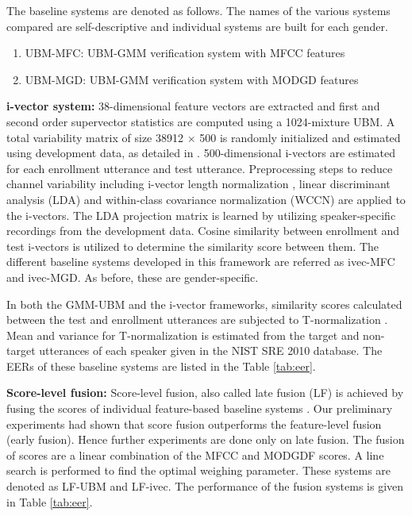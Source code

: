 \documentclass[preprint,12pt,5p]{elsarticle}
\begin{document}
The baseline systems are denoted as follows. The names of the various systems
compared are self-descriptive and individual systems are built for each gender.
\begin{enumerate}
\item UBM-MFC: UBM-GMM verification system with MFCC features
\item UBM-MGD: UBM-GMM verification system with MODGD features
\end{enumerate}

\textbf{i-vector system:} 
38-dimensional feature vectors are extracted and first and second order
supervector statistics are computed using a 1024-mixture UBM. A total
variability matrix of size 38912 $\times$ 500 is randomly initialized and
estimated using development data, as detailed in \cite{dehak_ivector,
kenny_JFA}.  500-dimensional i-vectors are estimated for each enrollment
utterance and test utterance. Preprocessing steps to reduce channel variability
including i-vector length normalization \cite{garciaRomero}, linear discriminant
analysis (LDA) and within-class covariance normalization (WCCN) are applied to
the i-vectors.  The LDA projection matrix is learned by utilizing
speaker-specific recordings from the development data. %
Cosine similarity between enrollment and test i-vectors is utilized to determine
the similarity score between them. The different baseline systems developed in
this framework are referred as ivec-MFC and ivec-MGD. As before, these are
gender-specific.

In both the GMM-UBM and the i-vector frameworks, similarity
scores calculated between the test and enrollment utterances 
are subjected to T-normalization \cite{tnorm}. Mean and variance for T-normalization is
estimated from the target and non-target utterances of each speaker given in the 
NIST SRE 2010 database. The EERs of these baseline systems are listed in the Table \ref{tab:eer}.

\textbf{Score-level fusion:}  Score-level fusion, also called late fusion (LF)
is achieved by fusing the scores of individual feature-based baseline systems
\cite{fusion}. Our preliminary experiments had shown that score fusion outperforms 
the feature-level fusion (early fusion). Hence further experiments are done only on late fusion.
The fusion of scores are a linear 
combination of the MFCC and MODGDF scores. A line search is performed 
to find the optimal weighing parameter. These systems are denoted as LF-UBM 
and LF-ivec.  The performance of the fusion systems is given in Table \ref{tab:eer}. 
	
\end{document}
